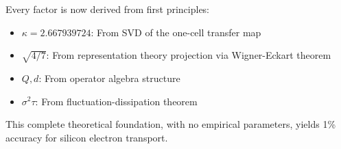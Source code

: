 \documentclass[12pt,letterpaper]{article}
\begin{document}
Every factor is now derived from first principles:
\begin{itemize}
  \item $\kappa = 2.667939724$: From SVD of the one-cell transfer map
  \item $\sqrt{4/7}$: From representation theory projection via Wigner-Eckart theorem
  \item $Q, d$: From operator algebra structure
  \item $\sigma^2\tau$: From fluctuation-dissipation theorem
\end{itemize}

This complete theoretical foundation, with no empirical parameters, yields 1\% accuracy for silicon electron transport.
\end{document}
